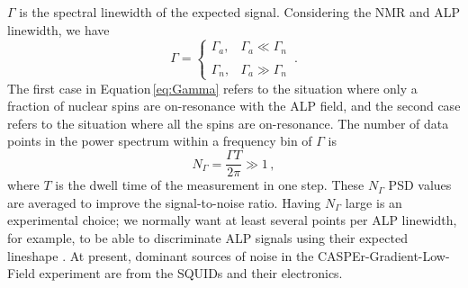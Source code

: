 \documentclass{WileyMSP-template}
\newcommand{\HB}[1]{\textcolor{orange}{Hendrik: #1}}
\newcommand{\AW}[1]{\textcolor{cyan}{Arne: #1}}
\begin{document}
	$\Gamma$ is the spectral linewidth of the expected signal. Considering the NMR and ALP linewidth, we have
	\begin{equation}
		\Gamma = \left\{
		\begin{array}{cl}
			\Gamma_a ,
			&  \Gamma_a \ll \Gamma_{n}\\
			\,& \\
			\Gamma_{n},
			& \Gamma_a  \gg \Gamma_{n}
		\end{array} \right.
		\,.\label{eq:Gamma}
	\end{equation}
	The first case in Equation\,\eqref{eq:Gamma} refers to the situation where only a fraction of nuclear spins are on-resonance with the ALP field, and the second case refers to the situation where all the spins are on-resonance. 
	The number of data points in the power spectrum within a frequency bin of $\Gamma$ is
	\begin{equation}
		N_{\Gamma} = \dfrac{\Gamma T}{2\pi} \gg 1
		\,,\label{eq:NGamma}
	\end{equation}
	where $T$ is the dwell time of the measurement in one step. 
	These $N_{\Gamma}$ PSD values are averaged to improve the signal-to-noise ratio. Having $N_{\Gamma}$ large is an experimental choice; we normally want at least several points per ALP linewidth, for example, to be able to discriminate ALP signals using their expected lineshape \cite{Gramolin2022_SpectralPhysRevD}.
	At present, dominant sources of noise in the CASPEr-Gradient-Low-Field experiment are from the SQUIDs and their electronics. 
\end{document}
